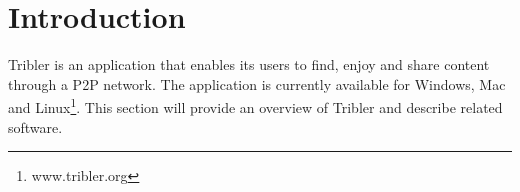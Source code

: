 \section{Introduction}
Tribler is an application that enables its users to find, enjoy and share content through a P2P network. The application is currently available for Windows, Mac and Linux\footnote{www.tribler.org}. This section will provide an overview of Tribler and describe related software.
